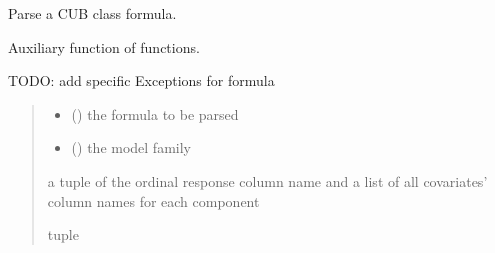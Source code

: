 \documentclass[letterpaper,10pt,english]{sphinxmanual}
\begin{document}
\begin{fulllineitems}
\label{\detokenize{cubmods:cubmods.general.formula_parser}}
\pysigstartsignatures
{}
\pysigstopsignatures
\sphinxAtStartPar
Parse a CUB class formula.

\sphinxAtStartPar
Auxiliary function of  functions.

\sphinxAtStartPar
TODO: add specific Exceptions for formula
\begin{quote}\begin{description}
\begin{itemize}
\item {} 
\sphinxAtStartPar
{} () \textendash{} the formula to be parsed

\item {} 
\sphinxAtStartPar
{} () \textendash{} the model family

\end{itemize}

\sphinxAtStartPar
a tuple of the ordinal response column name and a list of all
covariates’ column names for each component

\sphinxAtStartPar
tuple

\end{description}\end{quote}

\end{fulllineitems}

\end{document}
